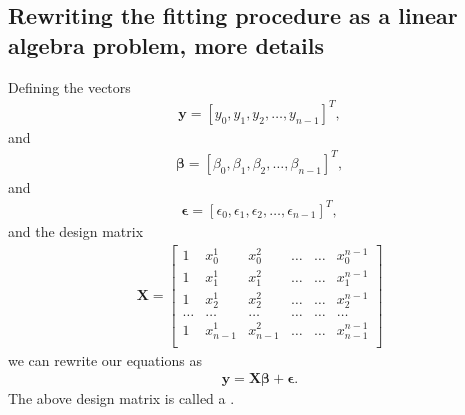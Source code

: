 \documentclass[letterpaper,10pt,english]{sphinxmanual}
\begin{document}
\subsection{Rewriting the fitting procedure as a linear algebra problem, more details}
\label{\detokenize{chapter4:rewriting-the-fitting-procedure-as-a-linear-algebra-problem-more-details}}
Defining the vectors
\begin{equation*}
\begin{split}
\boldsymbol{y} = [y_0,y_1, y_2,\dots, y_{n-1}]^T,
\end{split}
\end{equation*}
and
\begin{equation*}
\begin{split}
\boldsymbol{\beta} = [\beta_0,\beta_1, \beta_2,\dots, \beta_{n-1}]^T,
\end{split}
\end{equation*}
and
\begin{equation*}
\begin{split}
\boldsymbol{\epsilon} = [\epsilon_0,\epsilon_1, \epsilon_2,\dots, \epsilon_{n-1}]^T,
\end{split}
\end{equation*}
and the design matrix
\begin{equation*}
\begin{split}
\boldsymbol{X}=
\begin{bmatrix} 
1& x_{0}^1 &x_{0}^2& \dots & \dots &x_{0}^{n-1}\\
1& x_{1}^1 &x_{1}^2& \dots & \dots &x_{1}^{n-1}\\
1& x_{2}^1 &x_{2}^2& \dots & \dots &x_{2}^{n-1}\\                      
\dots& \dots &\dots& \dots & \dots &\dots\\
1& x_{n-1}^1 &x_{n-1}^2& \dots & \dots &x_{n-1}^{n-1}\\
\end{bmatrix}
\end{split}
\end{equation*}
we can rewrite our equations as
\begin{equation*}
\begin{split}
\boldsymbol{y} = \boldsymbol{X}\boldsymbol{\beta}+\boldsymbol{\epsilon}.
\end{split}
\end{equation*}
The above design matrix is called a .
\end{document}
